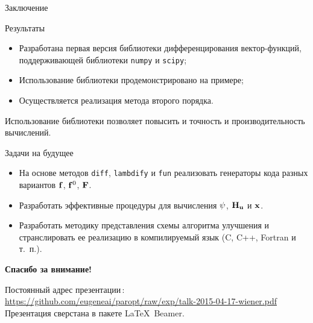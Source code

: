 \documentclass[10pt]{beamer}
\begin{document}
\begin{frame}{Заключение}
  \begin{block}{Результаты}
    \begin{itemize}
    \item Разработана первая версия библиотеки дифференцирования
      вектор-функций, поддерживающей библиотеки \texttt{numpy}
      и \texttt{scipy};
    \item Использование библиотеки продемонстрировано на примере;
    \item Осуществляется реализация метода второго порядка.
    \end{itemize}
    Использование библиотеки позволяет повысить и точность и
    производительность вычислений.
  \end{block}
\begin{block}{Задачи на будущее}
  \begin{itemize}
  \item На основе методов \texttt{diff}, \texttt{lambdify} и \texttt{fun} реализовать генераторы кода разных вариантов $\mathbf{f}$, $\mathbf{f}^0$, $\mathbf{F}$.
  \item Разработать эффективные процедуры для вычисления $\mathbf{\psi}$, $\mathbf{H}_{\mathbf{u}}$ и $\mathbf{x}$.
  \item Разработать методику представления схемы алгоритма улучшения и странслировать ее реализацию в компилируемый язык (C, C++, Fortran и т.~п.).
  \end{itemize}
\end{block}
\end{frame}

\begin{frame}{}
\vfill\vfill\vfill
\vfill
\begin{center}
  {\Huge\textbf{Спасибо за внимание!}}
\vspace{4em}
  \begin{block}{}
    Постоянный адрес презентации\,: \url{https://github.com/eugeneai/paropt/raw/exp/talk-2015-04-17-wiener.pdf}\\[1em]

  Презентация сверстана в пакете \LaTeX\ Beamer.
  \end{block}
\end{center}
\end{frame}
\end{document}
